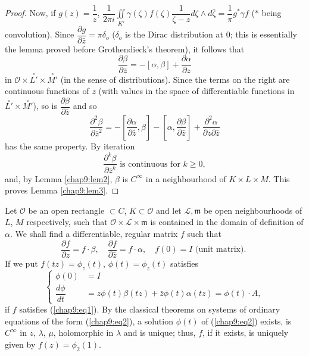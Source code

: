 \begin{proof}
Now, if $g(z) = \dfrac{1}{z}$, $\dfrac{1}{2\pi i} \iint\limits_{K'}
\gamma (\zeta) f(\zeta) \dfrac{1}{\zeta -z} d \zeta \wedge d
\bar{\zeta} = \dfrac{1}{\pi} g^\ast \gamma f$ ($\ast$ being
convolution). Since $\dfrac{\partial g}{\partial \bar{z}} = \pi
\delta_o$  ($\delta_o$ is the Dirac distribution at $0$; this is
essentially the lemma proved before Grothendieck's theorem), it
follows that 
$$
\frac{\partial \beta}{ \partial \bar{z}} =  - [\alpha, \beta] +
\frac{\partial \alpha}{\partial z}
$$
in $\mathscr{O} \times \overset{\circ}{L'} \times \overset{\circ}{M'}$
(in the sense of distributions). Since the terms on the right are
continuous functions of $z$ (with values in the space of
differentiable functions in $\overset{\circ}{L'} \times
\overset{\circ}{M'}$), so is $\dfrac{\partial\beta}{\partial \bar{z}}$
and so
$$
\frac{\partial^2 \beta}{\partial \bar{z}^2} = - \left[\frac{\partial
    \alpha}{\partial \bar{z}}, \beta \right]  - \left[\alpha,
  \frac{\partial \beta}{\partial \bar{z}} \right] + \frac{\partial^2
  \alpha}{\partial z \partial \bar{z}}
$$\pageoriginale
has the same property. By iteration
$$
\frac{\partial^k \beta}{\partial \bar{z}^k} \text{ is continuous for }
k \geq 0,
$$
and, by Lemma \ref{chap9:lem2}, $\beta$ is $C^\infty$ in a
neighbourhood of $K \times L \times M$. This proves Lemma \ref{chap9:lem3}.  
\end{proof}

\medskip
{} Let
$\mathscr{O}$ be an open rectangle $\subset C $, $K \subset
\mathscr{O}$ and let $\mathscr{L}, \mathfrak{m}$  be open
neighbourhoods of $L$, $M$ respectively, such that $\mathscr{O} \times
\mathscr{L} \times \mathfrak{m}$ is contained in the domain of
definition of $\alpha$. We shall find a differentiable, regular matrix
$f$ such that 
\begin{equation*}
\dfrac{\partial f}{\partial z} = f\cdot \beta, \quad
  \dfrac{\partial f}{\partial \bar{z}} = f \cdot \alpha, \quad f(0)
  = I \text{ (unit matrix).  } \tag{1}\label{chap9:eq1}
\end{equation*}
If we put $f(tz) = \phi_z (t)$, $\phi(t) = \phi_z (t)$ satisfies
\begin{equation*}
\begin{cases}
\phi(0) & = I \\
\dfrac{d\phi}{dt} & = z \phi(t) \beta (tz) + \bar{z} \phi (t) \alpha
(tz) = \phi(t) \cdot A,
\end{cases} \tag{2}\label{chap9:eq2}
\end{equation*}
if $f$ satisfies (\ref{chap9:eq1}). By the classical theorems on
systems of ordinary equations of the form (\ref{chap9:eq2}), a
solution $\phi(t)$ of (\ref{chap9:eq2}) exists, is  
$C^\infty$ in $z$, $\lambda$, $\mu$, holomorphic in $\lambda$ and is
unique; thus, $f$, if it exists, is uniquely given by $f(z) = \phi_2
(1)$. 

